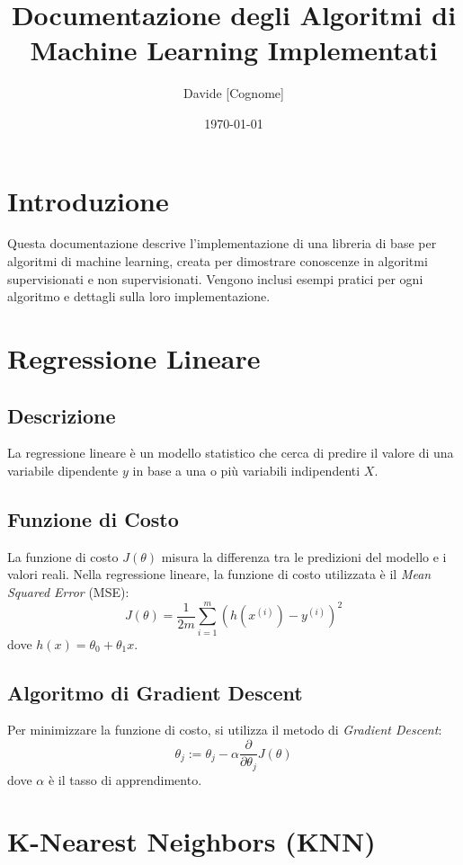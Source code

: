 \documentclass[a4paper,12pt]{report}
\title{Documentazione degli Algoritmi di Machine Learning Implementati}
\author{Davide [Cognome]}
\date{\today}
\begin{document}
\maketitle

\tableofcontents

\chapter*{Introduzione}
Questa documentazione descrive l'implementazione di una libreria di base per algoritmi di machine learning, creata per dimostrare conoscenze in algoritmi supervisionati e non supervisionati. Vengono inclusi esempi pratici per ogni algoritmo e dettagli sulla loro implementazione.

\chapter{Regressione Lineare}
\section{Descrizione}
La regressione lineare è un modello statistico che cerca di predire il valore di una variabile dipendente \( y \) in base a una o più variabili indipendenti \( X \).

\section{Funzione di Costo}
La funzione di costo \( J(\theta) \) misura la differenza tra le predizioni del modello e i valori reali. Nella regressione lineare, la funzione di costo utilizzata è il \textit{Mean Squared Error} (MSE):
\[
J(\theta) = \frac{1}{2m} \sum_{i=1}^{m} (h(x^{(i)}) - y^{(i)})^2
\]
dove \( h(x) = \theta_0 + \theta_1 x \).

\section{Algoritmo di Gradient Descent}
Per minimizzare la funzione di costo, si utilizza il metodo di \textit{Gradient Descent}:
\[
\theta_j := \theta_j - \alpha \frac{\partial}{\partial \theta_j} J(\theta)
\]
dove \( \alpha \) è il tasso di apprendimento.

\chapter{K-Nearest Neighbors (KNN)}
\end{document}
